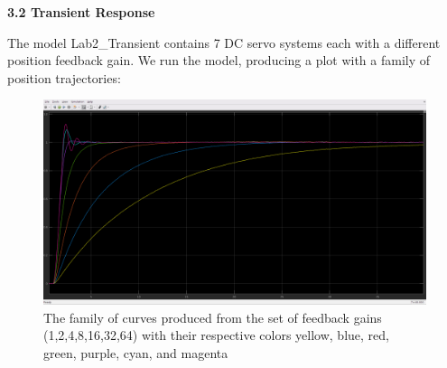 \documentclass[11pt,a4paper]{article}
\begin{document}
\textbf{3.2 Transient Response}

	The model Lab2\_Transient contains 7 DC servo systems each with a different position feedback gain. We run the model, producing a plot with a family of position trajectories:
	
\begin{figure}[H]
\includegraphics[width=\textwidth]{imglab/lab2sol_transfam.png}
\caption{The family of curves produced from the set of feedback gains (1,2,4,8,16,32,64) with their respective colors yellow, blue, red, green, purple, cyan, and magenta }
\label{fig:transfam}
\end{figure}
\end{document}
